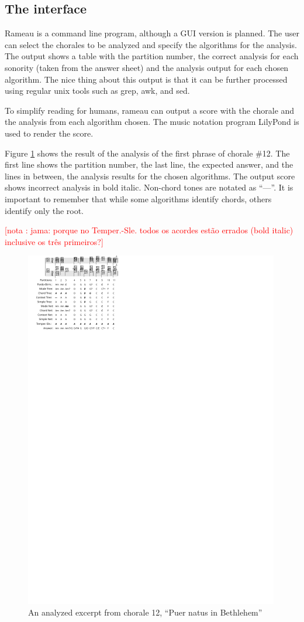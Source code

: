 \documentclass{article}
\newcounter{notacounter}
\newcommand{\nota}[1]{
  \addtocounter{notacounter}{1}
  \textcolor{red}{[nota \arabic{notacounter}: #1]}
}
\begin{document}
\subsection{The interface}
\label{sec:analysis-output}

Rameau is a command line program, although a GUI version is planned.
The user can select the chorales to be analyzed and specify the
algorithms for the analysis. The output shows a table with the
partition number, the correct analysis for each sonority (taken from
the answer sheet) and the analysis output for each chosen algorithm.
The nice thing about this output is that it can be further processed
using regular unix tools such as grep, awk, and sed.

To simplify reading for humans, rameau can output a score with the
chorale and the analysis from each algorithm chosen. The music
notation program LilyPond \cite{nienhuys.ea:lilypond} is used to
render the score.

Figure \ref{fig:coral-12} shows the result of the analysis of the
first phrase of chorale \#12. The first line shows the partition
number, the last line, the expected answer, and the lines in between,
the analysis results for the chosen algorithms. The output score shows
incorrect analysis in bold italic. Non-chord tones are notated as
``—''. It is important to remember that while some algorithms identify
chords, others identify only the root. \nota{jama: porque no
  Temper.-Sle. todos os acordes estão errados (bold italic) inclusive
  os três primeiros?}

\begin{figure}
  \centering
  \includegraphics[scale=4]{coral-012}
  \caption{An analyzed excerpt from chorale 12, ``Puer natus in Bethlehem''}
  \label{fig:coral-12}
\end{figure}
\end{document}
